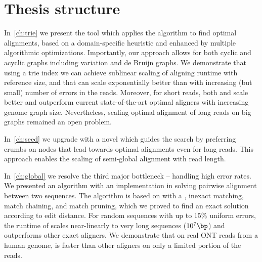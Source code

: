 \section*{Thesis structure}

In~\cref{ch:trie} we present the tool \astarix which applies the \A algorithm to
find optimal alignments, based on a domain-specific heuristic and enhanced by
multiple algorithmic optimizations. Importantly, our approach allows for both
cyclic and acyclic graphs including variation and de Bruijn graphs. We
demonstrate that using a trie index we can achieve sublinear scaling of aligning
runtime with reference size, and that \A can scale exponentially better than
\dijkstra with increasing (but small) number of errors in the reads. Moreover,
for short reads, both \astarix and \dijkstra scale better and outperform current
state-of-the-art optimal aligners with increasing genome graph size.
Nevertheless, scaling optimal alignment of long reads on big graphs remained an
open problem.

In~\cref{ch:seed} we upgrade \astarix with a novel \seedh which guides the \A
search by preferring crumbs on nodes that lead towards optimal alignments even
for long reads. This approach enables the scaling of semi-global alignment with
read length.

In~\cref{ch:global} we resolve the third major bottleneck -- handling high error
rates. We presented an algorithm with an implementation in \astarpa solving
pairwise alignment between two sequences. The algorithm is based on \A with a
\sh, inexact matching, match chaining, and match pruning, which we proved to
find an exact solution according to edit distance. For random sequences with up
to $15\%$ uniform errors, the runtime of \astarpa scales near-linearly to very
long sequences ($10^7\bp$) and outperforms other exact aligners. We demonstrate
that on real ONT reads from a human genome, \astarpa is faster than other
aligners on only a limited portion of the reads.